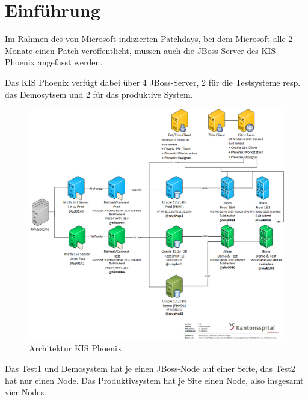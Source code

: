 
\chapter{Einführung}
{\color{black}Im Rahmen des von Microsoft indizierten Patchdays, bei dem Microsoft alle 2 Monate einen Patch veröffentlicht, müssen auch die \Gls{JBoss}-Server des KIS Phoenix angefasst werden.}

{\color{black} Das KIS Phoenix verfügt dabei über 4 JBoss-Server, 2 für die Testsysteme resp.
das Demosytsem und 2 für das produktive System.}
\begin{figure}[H]
    \centering
    \includegraphics[width=1\linewidth]{source/introduction/KIS_Phoenix_Architektur}
    \caption{Architektur KIS Phoenix\cite{KFDFYH5H}}
    \label{fig:architektur-kis-phoenix}
\end{figure}
{\color{black}
Das Test1 und Demosystem hat je einen JBoss-Node auf einer Seite, das Test2 hat nur einen Node.
Das Produktivsystem hat je Site einen Node, also insgesamt vier Nodes.}

